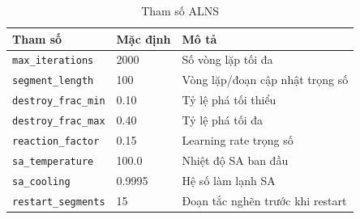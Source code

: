 \documentclass[12pt, a4paper]{article}
\begin{document}
\begin{table}[H]
\centering
\caption{Tham số ALNS}
\begin{tabular}{lll}
\toprule
\textbf{Tham số} & \textbf{Mặc định} & \textbf{Mô tả} \\
\midrule
\texttt{max\_iterations}     & 2000  & Số vòng lặp tối đa \\
\texttt{segment\_length}     & 100   & Vòng lặp/đoạn cập nhật trọng số \\
\texttt{destroy\_frac\_min}  & 0.10  & Tỷ lệ phá tối thiểu \\
\texttt{destroy\_frac\_max}  & 0.40  & Tỷ lệ phá tối đa \\
\texttt{reaction\_factor}    & 0.15  & Learning rate trọng số \\
\texttt{sa\_temperature}     & 100.0 & Nhiệt độ SA ban đầu \\
\texttt{sa\_cooling}         & 0.9995& Hệ số làm lạnh SA \\
\texttt{restart\_segments}   & 15    & Đoạn tắc nghẽn trước khi restart \\
\bottomrule
\end{tabular}
\end{table}
\end{document}
